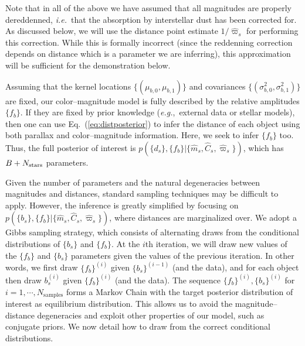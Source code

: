 \documentclass[manuscript, letterpaper]{aastex6}
\makeatletter
\let\origsubsection\subsection
\renewcommand\subsection{\@ifstar{\starsubsection}{\nostarsubsection}}
\newcommand\nostarsubsection[1]{\subsectionprelude\origsubsection{#1}}
\newcommand\starsubsection[1]{\subsectionprelude\origsubsection*{#1}}
\newcommand\subsectionprelude{\vspace{1em}}
\newcommand{\ie}{{\textit{i.e.}~}}
\newcommand{\eg}{{\textit{e.g.},~}}
\newcommand{\equref}[1]{{\xspace}Eq.~(\ref{#1})}
\newcommand{\nobj}{{N_{\rm stars}}}
\makeatother
\begin{document}
Note that in all of the above we have assumed that all magnitudes are properly dereddenned, \ie that the absorption by interstellar dust has been corrected for.
As discussed below, we will use the distance point estimate $1/\hat{\varpi}_s$ for performing this correction.
While this is formally incorrect (since the reddenning correction depends on distance which is a parameter we are inferring), this approximation will be sufficient for the demonstration below.


\subsection{Inference}

Assuming that the kernel locations $\{  (\mu_{b,0}, \mu_{b,1}) \}$ and covariances $\{(\sigma_{b,0}^2, \sigma_{b,1}^2)\}$ are fixed, our color--magnitude model is fully described by the relative amplitudes $\{ f_{b} \}$. 
If they are fixed by prior knowledge (\eg external data or stellar models), then one can use \equref{eq:distposterior} to infer the distance of each object using both parallax and color--magnitude information.
Here, we seek to infer $\{ f_{b} \}$ too.
Thus, the full posterior of interest is $p(\{ d_s \}, \{ f_{b} \} | \{ \hat{m}_s, \hat{C}_s, \hat{\varpi}_s \})$, which has $B + \nobj$ parameters.

Given the number of parameters and the natural degeneracies between magnitudes and distances, standard sampling techniques may be difficult to apply.
However, the inference is greatly simplified by focusing on $p(\{ b_s \}, \{ f_{b} \} | \{ \hat{m}_s, \hat{C}_s, \hat{\varpi}_s \})$, where distances are marginalized over.
We adopt a Gibbs sampling strategy, which consists of alternating draws from the conditional distributions of $\{ b_s \}$ and $\{ f_{b} \}$.
At the $i$th iteration, we will draw new values of the $\{ f_{b} \}$ and $\{b_s\}$ parameters given the values of the previous iteration.
In other words, we first draw $\{ f_{b} \}^{(i)}$ given $\{b_s\}^{(i-1)}$ (and the data), and for each object then draw $b_s^{(i)}$ given $\{ f_{b} \}^{(i)}$ (and the data). 
The sequence $\{ f_{b} \}^{(i)},\{b_s\}^{(i)}$ for $i=1, \cdots, N_\mathrm{samples}$ forms a Markov Chain with the target posterior distribution of interest as equilibrium distribution.
This allows us to avoid the magnitude--distance degeneracies and exploit other properties of our model, such as conjugate priors.
We now detail how to draw from the correct conditional distributions.
\end{document}
